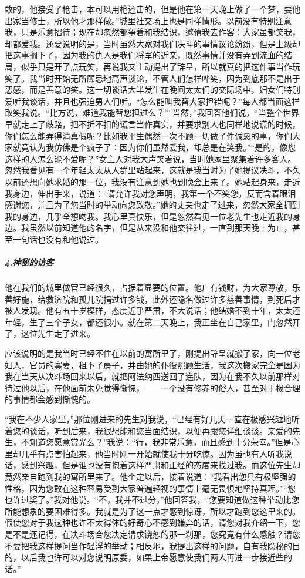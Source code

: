 敢的，他接受了枪击，本可以用枪还击的，但是他在第一天晚上做了一个梦，要他出家当修士，所以他才那样做。”城里社交场上也是同样情形。以前没有特别注意我，只是乐意招待；现在却忽然都争着和我结识，邀请我去作客：大家虽都笑我，却都爱我。还要说明的是，当时虽然大家对我们决斗的事情议论纷纷，但是上级却把这事搁下了，因为我的仇人是我们将军的近亲，既然事情并没有弄到流血的结局，似乎只是开了点玩笑，再说我又主动提出了辞呈，所以就真的把这件事当作玩笑了。我当时开始无所顾忌地高声谈论，不管人们怎样哗笑，因为到底那不是出于恶感，而是善意的笑。这一切谈话大半发生在晚间太太们的交际场中，妇女们特别爱听我谈话，并且也强迫男人们听。“怎么能叫我替大家担错呢？”每人都当面这样取笑我说。“比方说，难道我能替您担过么？”“当然，”我回答他们说，“当整个世界早就走上了歧路，把不折不扣的谎言当作真实，并要求别人也同样地说谎的时候，你们怎么能弄得清真假呢？比如我平生偶然一次不顾一切做了件诚恳的事，你们大家就竟认为我仿佛是个疯子了：因为你们虽然爱我，却总是在笑我。”“是的，像您这样的人怎么能不爱呢？”女主人对我大声笑着说，当时她家里聚集着许多客人。忽然我看见有一个年轻太太从人群里站起来，这就是我当时为了她提议决斗，不久以前还想向她求婚的那一位，我没有注意到她也到晚会上来了。她站起身来，走近我身边，伸出手来，说道：“请允许我对您声明，我第一个不笑您，反而含着眼泪感谢您，并且为了您当时的举动向您致敬。”她的丈夫也走了过来，忽然大家全拥到我的身边，几乎全想吻我。我心里真快乐，但是忽然看见一位老先生也走近我的身边。我虽然以前知道他的名字，但是从来没和他交往过，一直到那天晚上为止，甚至一句话也没有和他说过。
\subparagraph*{4.神秘的访客}
\par 他在我们的城里做官已经很久，占据着显要的位置。他广有钱财，为大家尊敬，乐善好施，给救济院和孤儿院捐过许多钱，此外还隐名做过许多慈善事情，到死后才被人发现。他有五十岁模样，态度近乎严肃，不大说话；他结婚不到十年，太太还年轻，生了三个子女，都还很小。就在第二天晚上，我正坐在自己家里，门忽然开了，这位先生走了进来。
\par 应该说明的是我当时已经不住在以前的寓所里了，刚提出辞呈就搬了家，向一位老妇人，官员的寡妻，租下了房子，并由她的仆役照顾生活，我这次搬家完全是因为我在当天从决斗场回来以后，就把阿法纳西送回了连队，因为在我不久以前那样对待过他以后，在他面前未免觉得惭愧，——一个没有修养的俗人，甚至对于极合理的事情都会感到惭愧的。
\par “我在不少人家里，”那位刚进来的先生对我说，“已经有好几天一直在极感兴趣地听着您的谈话，听到后来，我很想能和您当面结识，以便再跟您详细谈谈。亲爱的先生，不知道您愿意赏光么？”我说：“行，我非常乐意，而且感到十分荣幸。”但是心里却几乎有点害怕起来，他当时刚一开始就使我十分吃惊。因为虽也有人听我说话，感到兴趣，但是谁也没有抱着这样严肃和正经的态度来找过我。而这位先生却竟然亲自跑到我的寓所里来了。他坐定以后，接着说道：“我看出您具有极坚强的性格，因为您敢在这种容易受到大家普遍轻视的事情上毫无畏惧地坚持真理。”“您也许过奖了。”我对他说。“不，我并不过分，”他回答我，“您要知道做这种举动比您所能想象的要困难得多。我就是为了这一点才感到惊讶，所以才跑到您这里来的。假使您对于我这种也许不太得体的好奇心不感到嫌弃的话，请您对我介绍一下，您是不是还记得，在决斗场合您决定请求饶恕的那一刹那，您究竟有什么感触？请您不要把我这样提问当作轻浮的举动；相反地，我提出这样的问题，自有我隐秘的目的，以后我也许可以对您说明原委，如果上帝愿意使我们两人再进一步接近些的话。”

